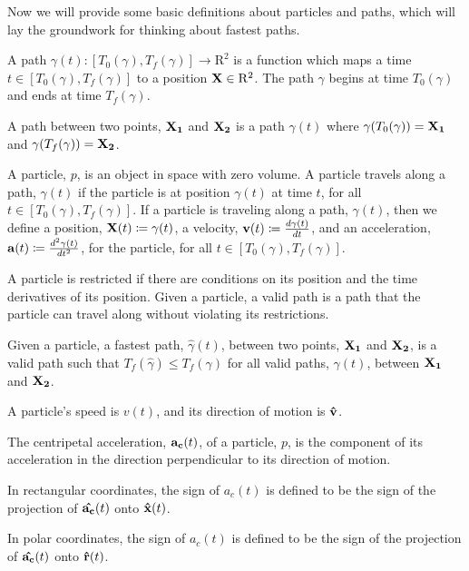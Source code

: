 Now we will provide some basic definitions about particles and paths, which will lay the groundwork for thinking about fastest paths.

\begin{definition}
  A path $\gamma(t): [T_0(\gamma), T_f(\gamma)] \to \mathrm{R}^2$ is a function which maps a time $t \in [T_0(\gamma), T_f(\gamma)]$ to a position $\mathbf{X} \in \mathrm{R}^2$. The path $\gamma$ begins at time $T_0(\gamma)$ and ends at time $T_f(\gamma)$.
\end{definition}

\begin{definition}
  A path between two points, $\mathbf{X_1}$ and $\mathbf{X_2}$ is a path $\gamma(t)$ where $\gamma(T_0(\gamma)) = \mathbf{X_1}$ and $\gamma(T_f(\gamma)) = \mathbf{X_2}$.
\end{definition}

\begin{definition}
  A particle, $p$, is an object in space with zero volume. A particle travels along a path, $\gamma(t)$ if the particle is at position $\gamma(t)$ at time $t$, for all $t \in [T_0(\gamma), T_f(\gamma)]$. If a particle is traveling along a path, $\gamma(t)$, then we define a position, $\mathbf{X}(t) \coloneqq \gamma(t)$, a velocity, $\mathbf{v}(t) \coloneqq \frac{d\gamma(t)}{dt}$, and an acceleration, $\mathbf{a}(t) \coloneqq \frac{d^2\gamma(t)}{dt^2}$, for the particle, for all $t \in [T_0(\gamma), T_f(\gamma)]$.

  A particle is restricted if there are conditions on its position and the time derivatives of its position. Given a particle, a valid path is a path that the particle can travel along without violating its restrictions.
\end{definition}

\begin{definition}
  Given a particle, a fastest path, $\hat{\gamma}(t)$, between two points, $\mathbf{X_1}$ and $\mathbf{X_2}$, is a valid path such that $T_f(\hat{\gamma}) \leq T_f(\gamma)$ for all valid paths, $\gamma(t)$, between $\mathbf{X_1}$ and $\mathbf{X_2}$.
\end{definition}

\begin{definition}
  A particle's speed is $v(t)$, and its direction of motion is $\mathbf{\hat{v}}$.
\end{definition}

\begin{definition}
  The centripetal acceleration, $\mathbf{a_c}(t)$, of a particle, $p$, is the component of its acceleration in the direction perpendicular to its direction of motion.

  In rectangular coordinates, the sign of $a_c(t)$ is defined to be the sign of the projection of $\mathbf{\hat{a_c}}(t)$ onto $\mathbf{\hat{x}}(t)$. 

  In polar coordinates, the sign of $a_c(t)$ is defined to be the sign of the projection of $\mathbf{\hat{a_c}}(t)$ onto $\mathbf{\hat{r}}(t)$.
\end{definition}

